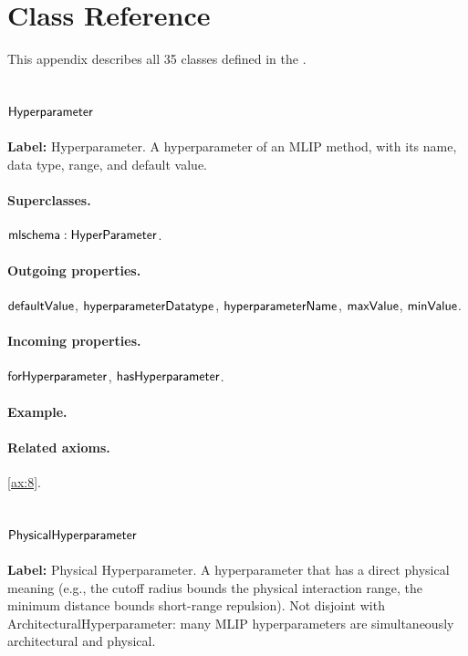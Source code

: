 \section{Class Reference}
\label{sec:class-reference}

This appendix describes all 35 classes defined in the \MLIPsOntology{}.

\subsection{$\mathsf{Hyperparameter}$}
\label{sec:term-Hyperparameter}

\textbf{Label:} Hyperparameter.
A hyperparameter of an MLIP method, with its name, data type, range, and default value.

\paragraph{Superclasses.} $\mathsf{mlschema:HyperParameter}$.

\paragraph{Outgoing properties.} $\mathsf{defaultValue}$, $\mathsf{hyperparameterDatatype}$, $\mathsf{hyperparameterName}$, $\mathsf{maxValue}$, $\mathsf{minValue}$.

\paragraph{Incoming properties.} $\mathsf{forHyperparameter}$, $\mathsf{hasHyperparameter}$.

\paragraph{Example.}

\paragraph{Related axioms.} \eqref{ax:8}.

\subsection{$\mathsf{PhysicalHyperparameter}$}
\label{sec:term-PhysicalHyperparameter}

\textbf{Label:} Physical Hyperparameter.
A hyperparameter that has a direct physical meaning (e.g., the cutoff radius bounds the physical interaction range, the minimum distance bounds short-range repulsion). Not disjoint with ArchitecturalHyperparameter: many MLIP hyperparameters are simultaneously architectural and physical.

